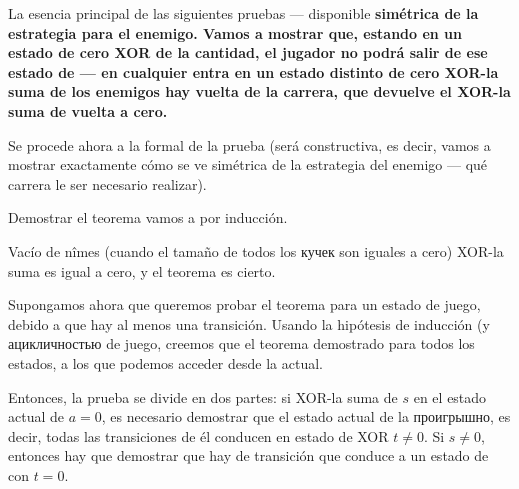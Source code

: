 La esencia principal de las siguientes pruebas --- disponible \bf{simétrica de la estrategia para el enemigo}. Vamos a mostrar que, estando en un estado de cero XOR de la cantidad, el jugador no podrá salir de ese estado de --- en cualquier entra en un estado distinto de cero XOR-la suma de los enemigos hay vuelta de la carrera, que devuelve el XOR-la suma de vuelta a cero.

Se procede ahora a la formal de la prueba (será constructiva, es decir, vamos a mostrar exactamente cómo se ve simétrica de la estrategia del enemigo --- qué carrera le ser necesario realizar).

Demostrar el teorema vamos a por inducción.

Vacío de nîmes (cuando el tamaño de todos los кучек son iguales a cero) XOR-la suma es igual a cero, y el teorema es cierto.

Supongamos ahora que queremos probar el teorema para un estado de juego, debido a que hay al menos una transición. Usando la hipótesis de inducción (y ацикличностью de juego, creemos que el teorema demostrado para todos los estados, a los que podemos acceder desde la actual.

Entonces, la prueba se divide en dos partes: si XOR-la suma de $s$ en el estado actual de $a=0$, es necesario demostrar que el estado actual de la проигрышно, es decir, todas las transiciones de él conducen en estado de XOR $t \ne 0$. Si $s \ne 0$, entonces hay que demostrar que hay de transición que conduce a un estado de con $t = 0$.

